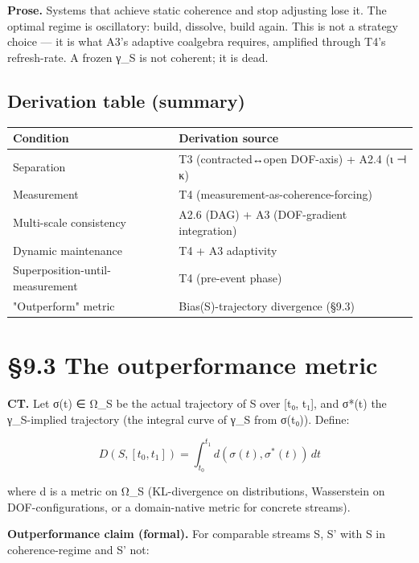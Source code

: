 \documentclass[11pt, openany]{book}
\newcommand{\sectionbreak}{\clearpage}
\begin{document}
\textbf{Prose.} Systems that achieve static coherence and stop adjusting lose it. The optimal regime is oscillatory: build, dissolve, build again. This is not a strategy choice --- it is what A3's adaptive coalgebra requires, amplified through T4's refresh-rate. A frozen γ\_\allowbreak{}S is not coherent; it is dead.

\subsection{Derivation table (summary)}

\begingroup\setlength{\tabcolsep}{3pt}\renewcommand{\arraystretch}{1.15}\footnotesize
\begin{center}
\begin{tabular}{p{1.81in} p{2.57in}}
\toprule
Condition & Derivation source \\
\midrule
Separation & T3 (contracted↔open DOF-axis) + A2.4 (ι ⊣ κ) \\
Measurement & T4 (measurement-as-coherence-forcing) \\
Multi-scale consistency & A2.6 (DAG) + A3 (DOF-gradient integration) \\
Dynamic maintenance & T4 + A3 adaptivity \\
Superposition-until-measurement & T4 (pre-event phase) \\
"Outperform" metric & Bias(S)-trajectory divergence (§9.3) \\
\bottomrule
\end{tabular}
\end{center}
\endgroup
\sectionbreak

\section{§9.3 The outperformance metric}

\textbf{CT.} Let σ(t) ∈ Ω\_\allowbreak{}S be the actual trajectory of S over [t₀, t₁], and σ*(t) the γ\_\allowbreak{}S-implied trajectory (the integral curve of γ\_\allowbreak{}S from σ(t₀)). Define:

$$D(S, [t_0, t_1]) = \int_{t_0}^{t_1} d(\sigma(t), \sigma^*(t)) \, dt$$

where d is a metric on Ω\_\allowbreak{}S (KL-divergence on distributions, Wasserstein on DOF-configurations, or a domain-native metric for concrete streams).

\textbf{Outperformance claim (formal).} For comparable streams S, S' with S in coherence-regime and S' not:
\end{document}
